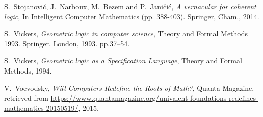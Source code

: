 \documentclass[english,letter paper,12pt,reqno]{article}
\theoremstyle{example}
\begin{document}
\begin{thebibliography}{BHLS03}
S.~Stojanovi\'{c}, J.~Narboux, M.~Bezem and P.~Jani\v{c}i\'{c}, \textsl{A vernacular for coherent logic}, In Intelligent Computer Mathematics (pp. 388-403). Springer, Cham., 2014.

S.~Vickers, \textsl{Geometric logic in computer science}, Theory and Formal Methods 1993. Springer, London, 1993. pp.37--54.

S.~Vickers, \textsl{Geometric logic as a Specification Language}, Theory and Formal Methods, 1994.

V.~Voevodsky, \textsl{Will Computers Redefine the Roots of Math?}, Quanta Magazine, retrieved from \href{https://www.quantamagazine.org/univalent-foundations-redefines-mathematics-20150519/}{https://www.quantamagazine.org/univalent-foundations-redefines-mathematics-20150519/}, 2015.

\end{thebibliography}
\end{document}
